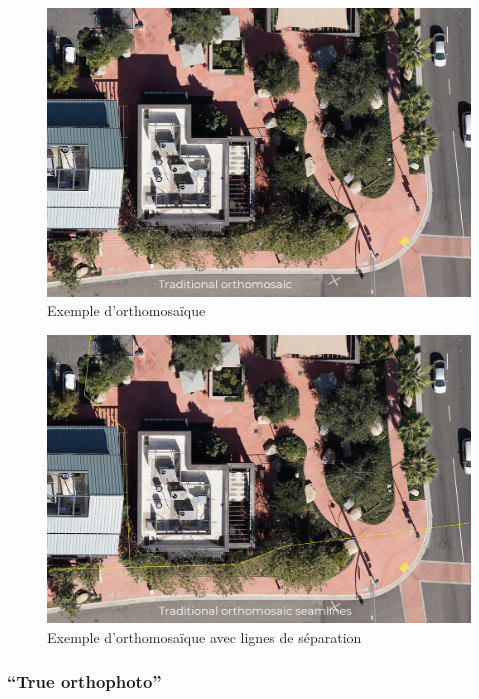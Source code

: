 \newpage
\begin{figure}[H]
    \centering
    \includegraphics[width=1\linewidth]{03-tail//A1_fondamentaux_ML//A1_figures/A1_12_orthomosaique.png}
    \caption{Exemple d’orthomosaïque \cite{barrette_different_2022}}
    \label{fig:A1_12_orthomosaique}
\end{figure}

\begin{figure}[H]
    \centering
    \includegraphics[width=1\linewidth]{03-tail//A1_fondamentaux_ML//A1_figures/A1_13_orthomosaique_lignes.png}
    \caption{Exemple d'orthomosaïque avec lignes de séparation \cite{barrette_different_2022}}
    \label{fig:A1_13_orthomosaique_lignes}
\end{figure}

\newpage
\subsubsection{``True orthophoto''}

